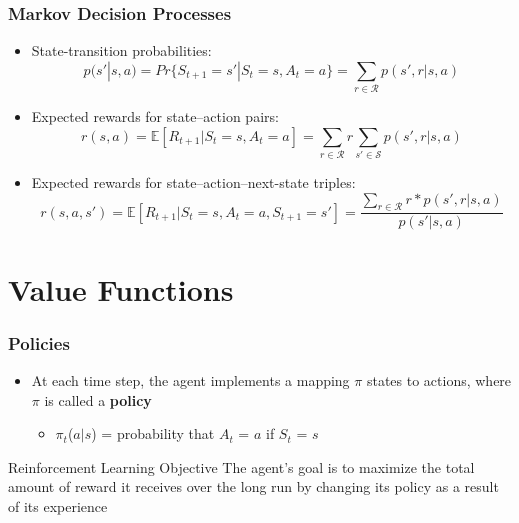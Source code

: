 \documentclass{beamer}
\begin{document}

\begin{frame}
\frametitle{Markov Decision Processes}
\begin{itemize}
\item State-transition probabilities:
\begin{equation}
p(s' | s,a) = Pr\{S_{t+1} = s' | S_t = s, A_t = a\} =  \sum_{r \in \mathscr{R} } p(s',r | s,a)
\nonumber
\end{equation}
\item Expected rewards for state--action pairs:
\begin{equation}
r(s,a) = \mathbb{E}[R_{t+1} | S_t = s, A_t = a] = \sum_{r \in \mathscr{R} } r \sum_{s' \in \mathscr{S} } p(s',r | s,a)
\nonumber
\end{equation}
\item Expected rewards for state--action--next-state triples:
\begin{equation}
r(s,a,s') = \mathbb{E}[R_{t+1} | S_t = s, A_t = a, S_{t+1}  = s'] =  \dfrac{ \sum_{r \in \mathscr{R} } r*p(s',r | s,a)}{p(s'| s,a)}
\nonumber
\end{equation}
\end{itemize}
\end{frame}



\section{Value Functions} %



\begin{frame}
\frametitle{Policies}
\begin{itemize}
\item At each time step, the agent implements a mapping $\pi$ states to actions, where $\pi$ is called a \textbf{policy}
   \begin{itemize}
   	\item $\pi_t$($a|s$) = probability that $A_t$ = $a$ if $S_t$ = $s$
      \end{itemize}
\end{itemize}
\begin{block}{Reinforcement Learning Objective}
The agent's goal is to maximize the total amount of reward it receives over the long run by changing its policy as a result of its experience
\end{block}
\end{frame}
\end{document}
